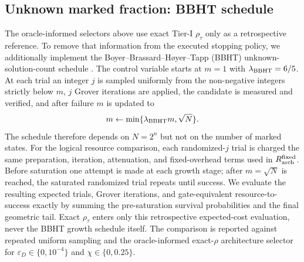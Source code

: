 \documentclass[5p,times]{elsarticle}
\begin{document}
\subsection{Unknown marked fraction: BBHT schedule}
The oracle-informed selectors above use exact Tier-I $\rho_\tau$ only as a retrospective reference. To remove that information from the executed stopping policy, we additionally implement the Boyer--Brassard--H{\o}yer--Tapp (BBHT) unknown-solution-count schedule \cite{boyer1998}. The control variable starts at $m=1$ with $\lambda_{\rm BBHT}=6/5$. At each trial an integer $j$ is sampled uniformly from the non-negative integers strictly below $m$, $j$ Grover iterations are applied, the candidate is measured and verified, and after failure $m$ is updated to
\begin{equation}
m\leftarrow\min\{\lambda_{\rm BBHT}m,\sqrt{N}\}.
\end{equation}
The schedule therefore depends on $N=2^n$ but not on the number of marked states. For the logical resource comparison, each randomized-$j$ trial is charged the same preparation, iteration, attenuation, and fixed-overhead terms used in $R_{\rm arch}^{\rm fixed}$. Before saturation one attempt is made at each growth stage; after $m=\sqrt N$ is reached, the saturated randomized trial repeats until success. We evaluate the resulting expected trials, Grover iterations, and gate-equivalent resource-to-success exactly by summing the pre-saturation survival probabilities and the final geometric tail. Exact $\rho_\tau$ enters only this retrospective expected-cost evaluation, never the BBHT growth schedule itself. The comparison is reported against repeated uniform sampling and the oracle-informed exact-$\rho$ architecture selector for $\varepsilon_D\in\{0,10^{-4}\}$ and $\chi\in\{0,0.25\}$.
\end{document}
